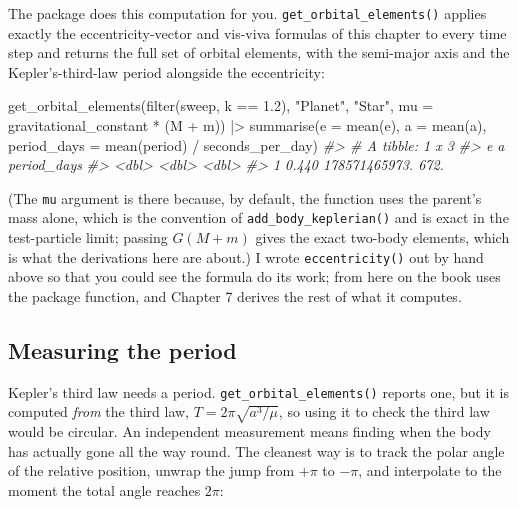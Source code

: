 \documentclass[
  10.5pt,
  letterpaper,
]{scrbook}
\newenvironment{Shaded}{\begin{snugshade}}{\end{snugshade}}
\newcommand{\AttributeTok}[1]{\textcolor[rgb]{0.00,0.00,0.00}{#1}}
\newcommand{\CommentTok}[1]{\textcolor[rgb]{0.00,0.00,0.00}{\textit{#1}}}
\newcommand{\FloatTok}[1]{\textcolor[rgb]{0.00,0.00,0.00}{#1}}
\newcommand{\FunctionTok}[1]{\textcolor[rgb]{0.00,0.00,0.00}{#1}}
\newcommand{\NormalTok}[1]{\textcolor[rgb]{0.00,0.00,0.00}{#1}}
\newcommand{\SpecialCharTok}[1]{\textcolor[rgb]{0.00,0.00,0.00}{#1}}
\newcommand{\StringTok}[1]{\textcolor[rgb]{0.00,0.00,0.00}{#1}}
\theoremstyle{definition}
\theoremstyle{plain}
\theoremstyle{remark}
\begin{document}
The package does this computation for you.
\texttt{get\_orbital\_elements()} applies exactly the
eccentricity-vector and vis-viva formulas of this chapter to every time
step and returns the full set of orbital elements, with the semi-major
axis and the Kepler's-third-law period alongside the eccentricity:

\begin{Shaded}
\begin{Highlighting}[]
\FunctionTok{get\_orbital\_elements}\NormalTok{(}\FunctionTok{filter}\NormalTok{(sweep, k }\SpecialCharTok{==} \FloatTok{1.2}\NormalTok{), }\StringTok{"Planet"}\NormalTok{, }\StringTok{"Star"}\NormalTok{,}
                     \AttributeTok{mu =}\NormalTok{ gravitational\_constant }\SpecialCharTok{*}\NormalTok{ (M }\SpecialCharTok{+}\NormalTok{ m)) }\SpecialCharTok{|\textgreater{}}
  \FunctionTok{summarise}\NormalTok{(}\AttributeTok{e =} \FunctionTok{mean}\NormalTok{(e), }\AttributeTok{a =} \FunctionTok{mean}\NormalTok{(a), }\AttributeTok{period\_days =} \FunctionTok{mean}\NormalTok{(period) }\SpecialCharTok{/}\NormalTok{ seconds\_per\_day)}
\CommentTok{\#\textgreater{} \# A tibble: 1 x 3}
\CommentTok{\#\textgreater{}       e             a period\_days}
\CommentTok{\#\textgreater{}   \textless{}dbl\textgreater{}         \textless{}dbl\textgreater{}       \textless{}dbl\textgreater{}}
\CommentTok{\#\textgreater{} 1 0.440 178571465973.        672.}
\end{Highlighting}
\end{Shaded}

(The \texttt{mu} argument is there because, by default, the function
uses the parent's mass alone, which is the convention of
\texttt{add\_body\_keplerian()} and is exact in the test-particle limit;
passing \(G(M+m)\) gives the exact two-body elements, which is what the
derivations here are about.) I wrote \texttt{eccentricity()} out by hand
above so that you could see the formula do its work; from here on the
book uses the package function, and Chapter 7 derives the rest of what
it computes.

\subsection{Measuring the period}\label{measuring-the-period}

Kepler's third law needs a period. \texttt{get\_orbital\_elements()}
reports one, but it is computed \emph{from} the third law,
\(T = 2\pi\sqrt{a^3/\mu}\), so using it to check the third law would be
circular. An independent measurement means finding when the body has
actually gone all the way round. The cleanest way is to track the polar
angle of the relative position, unwrap the jump from \(+\pi\) to
\(-\pi\), and interpolate to the moment the total angle reaches
\(2\pi\):
\end{document}
